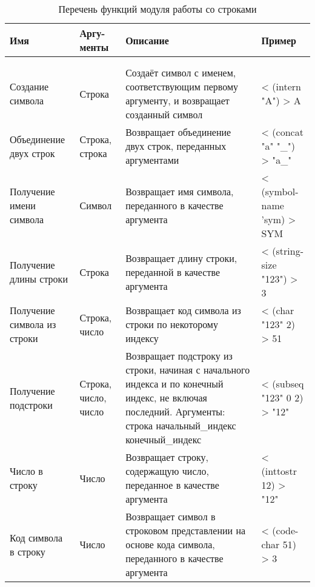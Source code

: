 \begin{xltabular}{\textwidth}{|p{3.6cm}|p{1.8cm}|p{6cm}|X|}
	\caption{Перечень функций модуля работы со строками\label{funcprimstr:table}}\\ \hline
	\centrow Имя & \centrow Аргу- \linebreak менты & \centrow Описание & \centrow Пример \\ \hline
	 &  &  &  \\ \hline
	\endfirsthead
	 &  &  &  \\ \hline
	\finishhead
	Создание символа & Строка & Создаёт символ с именем, соответствующим первому аргументу, и возвращает созданный символ & < (intern "A") \linebreak > A \\ \hline 
	Объединение двух строк & Строка, строка & Возвращает объединение двух строк, переданных аргументами & < (concat "a" "\_") \linebreak > "a\_" \\ \hline 
	Получение имени символа & Символ & Возвращает имя символа, переданного в качестве аргумента & < (symbol-name 'sym) \linebreak > SYM \\ \hline 
	Получение длины строки & Строка & Возвращает длину строки, переданной в качестве аргумента & < (string-size "123") \linebreak > 3 \\ \hline 
	Получение символа из строки & Строка, число & Возвращает код символа из строки по некоторому индексу & < (char "123" 2) \linebreak > 51 \\ \hline 
	Получение подстроки & Строка, число, число & Возвращает подстроку из строки, начиная с начального индекса и по конечный индекс, не включая последний. Аргументы: строка начальный\_индекс конечный\_индекс & < (subseq "123" 0 2) \linebreak > "12" \\ \hline 
	Число в строку & Число & Возвращает строку, содержащую число, переданное в качестве аргумента & < (inttostr 12) \linebreak > "12" \\ \hline 
	Код символа в строку & Число & Возвращает символ в строковом представлении на основе кода символа, переданного в качестве аргумента & < (code-char 51) \linebreak > 3
	
\end{xltabular}

